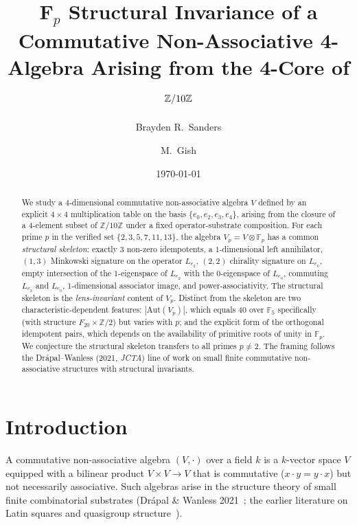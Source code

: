 \documentclass[11pt,reqno]{amsart}
\title[F$_p$ Structural Invariance of a 4-Algebra]
{F$_p$ Structural Invariance of a Commutative Non-Associative 4-Algebra
 Arising from the 4-Core of $\Z/10\Z$}
\author{Brayden R.\ Sanders}
\author{M.\ Gish}
\date{\today}
\theoremstyle{plain}
\theoremstyle{definition}
\theoremstyle{remark}
\newcommand{\Z}{\mathbb{Z}}
\newcommand{\F}{\mathbb{F}}
\newcommand{\Aut}{\mathrm{Aut}}
\begin{document}
\begin{abstract}
We study a 4-dimensional commutative non-associative algebra $V$ defined
by an explicit $4 \times 4$ multiplication table on the basis
$\{e_0, e_2, e_3, e_4\}$, arising from the closure of a 4-element
subset of $\Z/10\Z$ under a fixed operator-substrate composition. For
each prime $p$ in the verified set $\{2, 3, 5, 7, 11, 13\}$, the
algebra $V_p = V \otimes \F_p$ has a common \emph{structural skeleton}:
exactly $3$ non-zero idempotents, a $1$-dimensional left annihilator,
$(1, 3)$ Minkowski signature on the operator $L_{e_2}$, $(2, 2)$
chirality signature on $L_{e_0}$, empty intersection of the
$1$-eigenspace of $L_{e_2}$ with the $0$-eigenspace of $L_{e_0}$,
commuting $L_{e_2}$ and $L_{e_0}$, $1$-dimensional associator image,
and power-associativity. The structural skeleton is the
\emph{lens-invariant} content of $V_p$. Distinct from the skeleton are
two characteristic-dependent features: $|\Aut(V_p)|$, which equals
$40$ over $\F_5$ specifically (with structure $F_{20} \times \Z/2$) but
varies with $p$; and the explicit form of the orthogonal idempotent
pairs, which depends on the availability of primitive roots of unity
in $\F_p$. We conjecture the structural skeleton transfers to all
primes $p \neq 2$. The framing follows the Drápal--Wanless (2021,
\emph{JCTA}) line of work on small finite commutative non-associative
structures with structural invariants.
\end{abstract}

\maketitle

\tableofcontents

\section{Introduction}

A commutative non-associative algebra $(V, \cdot)$ over a field $k$ is
a $k$-vector space $V$ equipped with a bilinear product
$V \times V \to V$ that is commutative ($x \cdot y = y \cdot x$) but
not necessarily associative. Such algebras arise in the structure
theory of small finite combinatorial substrates (Drápal \& Wanless
2021~\cite{DrapalWanless2021}; the earlier literature on Latin squares
and quasigroup structure~\cite{StonesWanless2010}).
\end{document}
